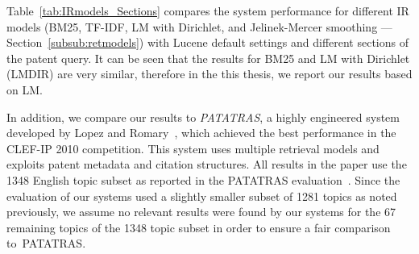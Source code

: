 Table~\ref{tab:IRmodels_Sections} compares the system performance for different IR models 
(BM25, TF-IDF, LM with Dirichlet, and Jelinek-Mercer smoothing --- Section~\ref{subsub:retmodels}) with Lucene default settings and different sections of the patent query.
It can be seen that the results for BM25 and LM with Dirichlet (LMDIR) are very similar, therefore in the this thesis, we report our results based on LM.    

In addition, we compare our results to \textit{PATATRAS}, a highly engineered system developed by Lopez and Romary~\cite{lopez2010experiments}, 
which achieved the best performance in the CLEF-IP 2010 competition. This system uses multiple retrieval models %
and exploits patent metadata and citation structures.  All results in the paper use the 1348 English topic subset as reported in the PATATRAS evaluation~\citep{piroi2010clef}.  Since the evaluation of our systems used a slightly smaller subset of 1281 topics as noted previously, we assume no relevant results were found by our systems for the 67 remaining topics of the 1348 topic subset in order to ensure a fair comparison to~PATATRAS.


% 

